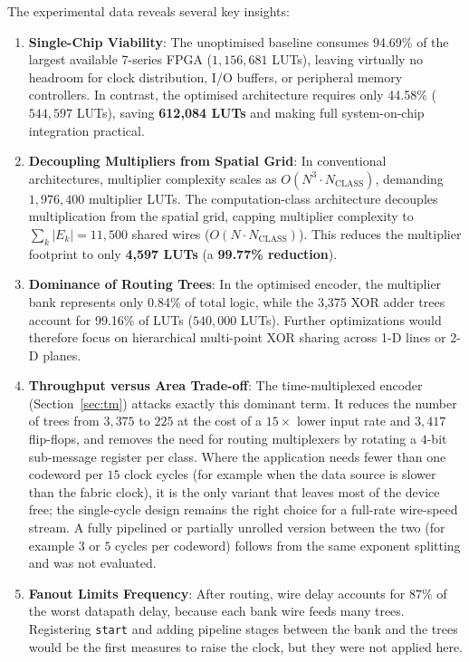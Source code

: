 \documentclass[11pt,a4paper]{article}
\begin{document}
The experimental data reveals several key insights:
\begin{enumerate}
    \item \textbf{Single-Chip Viability}: The unoptimised baseline consumes 94.69\% of the largest available 7-series FPGA ($1,156,681$ LUTs), leaving virtually no headroom for clock distribution, I/O buffers, or peripheral memory controllers. In contrast, the optimised architecture requires only 44.58\% ($544,597$ LUTs), saving \textbf{612,084 LUTs} and making full system-on-chip integration practical.
    \item \textbf{Decoupling Multipliers from Spatial Grid}: In conventional architectures, multiplier complexity scales as $O(N^3 \cdot N_{\text{CLASS}})$, demanding $1,976,400$ multiplier LUTs. The computation-class architecture decouples multiplication from the spatial grid, capping multiplier complexity to $\sum_{k} |E_k| = 11,500$ shared wires ($O(N \cdot N_{\text{CLASS}})$). This reduces the multiplier footprint to only \textbf{4,597 LUTs} (a \textbf{99.77\% reduction}).
    \item \textbf{Dominance of Routing Trees}: In the optimised encoder, the multiplier bank represents only 0.84\% of total logic, while the 3,375 XOR adder trees account for 99.16\% of LUTs ($540,000$ LUTs). Further optimizations would therefore focus on hierarchical multi-point XOR sharing across 1-D lines or 2-D planes.
    \item \textbf{Throughput versus Area Trade-off}: The time-multiplexed encoder (Section~\ref{sec:tm}) attacks exactly this dominant term. It reduces the number of trees from $3,375$ to $225$ at the cost of a $15\times$ lower input rate and $3,417$ flip-flops, and removes the need for routing multiplexers by rotating a $4$-bit sub-message register per class. Where the application needs fewer than one codeword per $15$ clock cycles (for example when the data source is slower than the fabric clock), it is the only variant that leaves most of the device free; the single-cycle design remains the right choice for a full-rate wire-speed stream. A fully pipelined or partially unrolled version between the two (for example $3$ or $5$ cycles per codeword) follows from the same exponent splitting and was not evaluated.
    \item \textbf{Fanout Limits Frequency}: After routing, wire delay accounts for $87\%$ of the worst datapath delay, because each bank wire feeds many trees. Registering \texttt{start} and adding pipeline stages between the bank and the trees would be the first measures to raise the clock, but they were not applied here.
\end{enumerate}
\end{document}
